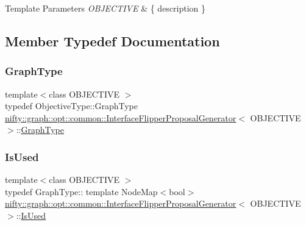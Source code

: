 \begin{DoxyTemplParams}{Template Parameters}
{\em O\+B\+J\+E\+C\+T\+I\+VE} & \{ description \} \\
\hline
\end{DoxyTemplParams}


\subsection{Member Typedef Documentation}
\mbox{\label{classnifty_1_1graph_1_1opt_1_1common_1_1InterfaceFlipperProposalGenerator_ab4ea7c93e1f428ccbc18970150cac7b8}} 
\subsubsection{\texorpdfstring{Graph\+Type}{GraphType}}
{\footnotesize\ttfamily template$<$class O\+B\+J\+E\+C\+T\+I\+VE $>$ \\
typedef Objective\+Type\+::\+Graph\+Type \hyperlink{classnifty_1_1graph_1_1opt_1_1common_1_1InterfaceFlipperProposalGenerator}{nifty\+::graph\+::opt\+::common\+::\+Interface\+Flipper\+Proposal\+Generator}$<$ O\+B\+J\+E\+C\+T\+I\+VE $>$\+::\hyperlink{classnifty_1_1graph_1_1opt_1_1common_1_1InterfaceFlipperProposalGenerator_ab4ea7c93e1f428ccbc18970150cac7b8}{Graph\+Type}}

\mbox{\label{classnifty_1_1graph_1_1opt_1_1common_1_1InterfaceFlipperProposalGenerator_aa1d36e33904e90a5fb6460cf883bf871}} 
\subsubsection{\texorpdfstring{Is\+Used}{IsUsed}}
{\footnotesize\ttfamily template$<$class O\+B\+J\+E\+C\+T\+I\+VE $>$ \\
typedef Graph\+Type\+:: template Node\+Map$<$bool$>$ \hyperlink{classnifty_1_1graph_1_1opt_1_1common_1_1InterfaceFlipperProposalGenerator}{nifty\+::graph\+::opt\+::common\+::\+Interface\+Flipper\+Proposal\+Generator}$<$ O\+B\+J\+E\+C\+T\+I\+VE $>$\+::\hyperlink{classnifty_1_1graph_1_1opt_1_1common_1_1InterfaceFlipperProposalGenerator_aa1d36e33904e90a5fb6460cf883bf871}{Is\+Used}}

